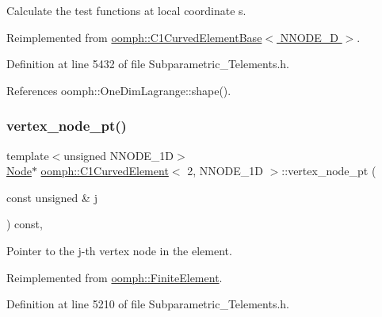 Calculate the test functions at local coordinate s. 



Reimplemented from \hyperlink{classoomph_1_1C1CurvedElementBase_aa953e1d89a6c059ac89c972feb0aea74}{oomph\+::\+C1\+Curved\+Element\+Base$<$ N\+N\+O\+D\+E\+\_\+D $>$}.



Definition at line 5432 of file Subparametric\+\_\+\+Telements.\+h.



References oomph\+::\+One\+Dim\+Lagrange\+::shape().

\mbox{\label{classoomph_1_1C1CurvedElement_3_012_00_01NNODE__1D_01_4_a0fe82acd4ccebb368f96c657927063c8}} 
\subsubsection{\texorpdfstring{vertex\+\_\+node\+\_\+pt()}{vertex\_node\_pt()}}
{\footnotesize\ttfamily template$<$unsigned N\+N\+O\+D\+E\+\_\+1D$>$ \\
\hyperlink{classoomph_1_1Node}{Node}$\ast$ \hyperlink{classoomph_1_1C1CurvedElement}{oomph\+::\+C1\+Curved\+Element}$<$ 2, N\+N\+O\+D\+E\+\_\+1D $>$\+::vertex\+\_\+node\+\_\+pt (\begin{DoxyParamCaption}\item[{const unsigned \&}]{j }\end{DoxyParamCaption}) const\hspace{0.3cm}{\ttfamily [inline]}, {\ttfamily [virtual]}}



Pointer to the j-\/th vertex node in the element. 



Reimplemented from \hyperlink{classoomph_1_1FiniteElement_a863c4382c879a77ad5607c6f9781c761}{oomph\+::\+Finite\+Element}.



Definition at line 5210 of file Subparametric\+\_\+\+Telements.\+h.



